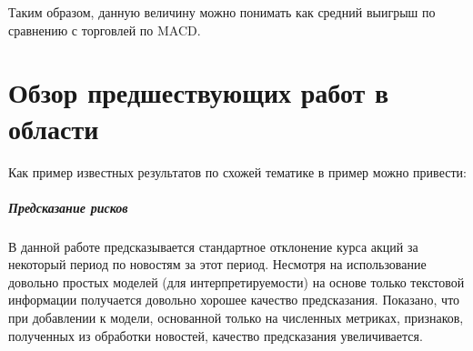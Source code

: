 \documentclass[pdftex,ptm,14pt,a4paper]{report}
\begin{document}
Таким образом, данную величину можно понимать как средний выигрыш по сравнению с торговлей по MACD.

\chapter{Обзор предшествующих работ в области}

Как пример известных результатов по схожей тематике в пример можно привести:

\paragraph{Предсказание рисков \cite{risk_predict}}

В данной работе предсказывается стандартное отклонение курса акций за некоторый период по новостям за этот период.
Несмотря на использование довольно простых моделей (для интерпретируемости) на основе только текстовой информации получается
довольно хорошее качество предсказания. Показано, что при добавлении к модели, основанной только на численных метриках,
 признаков, полученных из обработки новостей, качество предсказания увеличивается.
\end{document}

